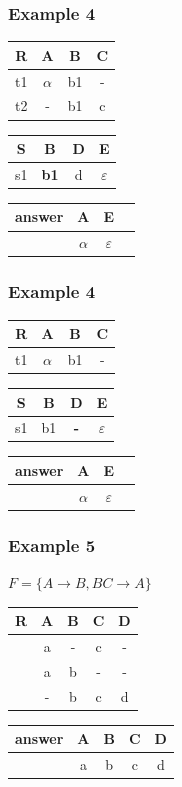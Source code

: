 \documentclass{beamer}
\begin{document}
\begin{frame}
  \frametitle{Example 4}

  \begin{tabular}{ c | c c c}
  R & A & B & C \\
  \hline
  t1 & $\alpha$  & b1  & - \\
  t2 & -  & b1  & c \\
  \end{tabular}
   \begin{tabular}{ c | c c c}
  S & B & D & E \\
  \hline
  s1 & \textbf{b1}  & d  & $\varepsilon$ \\
  \end{tabular}
  \begin{tabular}{ c | c c c}
  answer & A & E \\
  \hline
   & $\alpha$& $\varepsilon$\\
  \end{tabular}
\end{frame}
\begin{frame}
  \frametitle{Example 4}

  \begin{tabular}{ c | c c c}
  R & A & B & C \\
  \hline
  t1 & $\alpha$  & b1  & - \\
  \end{tabular}
   \begin{tabular}{ c | c c c}
  S & B & D & E \\
  \hline
  s1 & b1  & \textbf{-}  & $\varepsilon$ \\
  \end{tabular}
  \begin{tabular}{ c | c c c}
  answer & A & E \\
  \hline
   & $\alpha$& $\varepsilon$\\
  \end{tabular}
\end{frame}

\begin{frame}
  \frametitle{Example 5}
  $F = \{A \rightarrow B, BC \rightarrow A\}$\\

  \begin{tabular}{ c | c c c c}
  R & A & B & C & D\\
  \hline
  &a & - & c  & - \\
  &a & b & -  & - \\
  &- & b & c  & d \\
  \end{tabular}

  \begin{tabular}{ c | c c c c}
  answer & A & B & C & D\\
  \hline
  & a & b & c  & d \\
  \end{tabular}
\end{frame}
\end{document}
